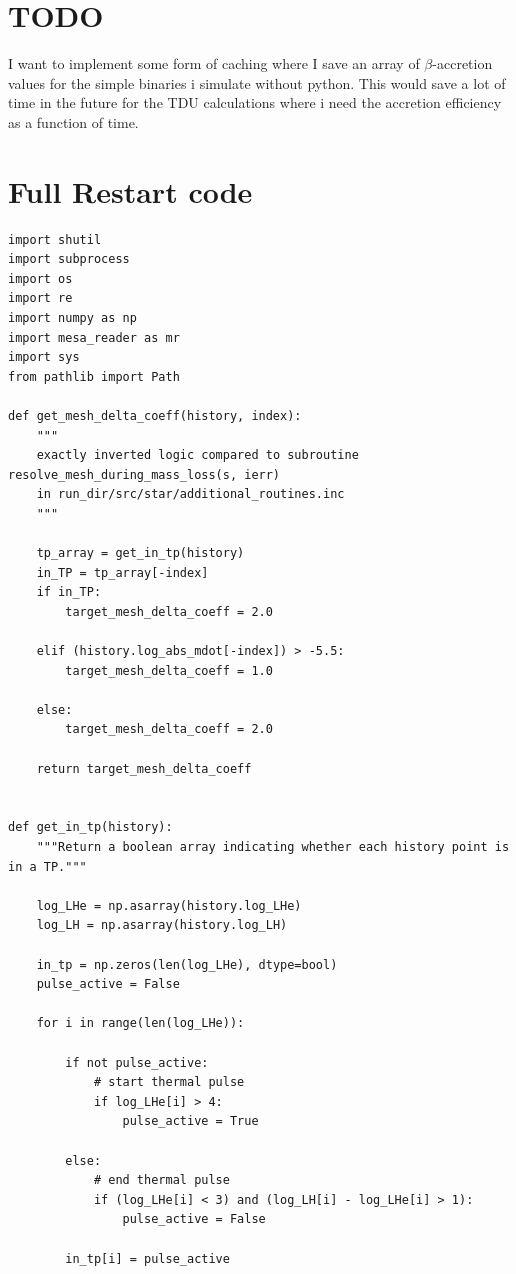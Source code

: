 \documentclass[a4paper,10pt]{article}
\begin{document}
\section{TODO}
I want to implement some form of caching where I save an array of \(\beta \)-accretion values for the simple binaries i simulate without python. This would save a lot of time in the future for the TDU calculations where i need the accretion efficiency as a function of time.


\nextpage
\appendix
\section{Full Restart code}
\begin{full}
\begin{verbatim}
import shutil
import subprocess
import os
import re
import numpy as np
import mesa_reader as mr
import sys
from pathlib import Path

def get_mesh_delta_coeff(history, index):
    """
    exactly inverted logic compared to subroutine resolve_mesh_during_mass_loss(s, ierr)
    in run_dir/src/star/additional_routines.inc
    """

    tp_array = get_in_tp(history)
    in_TP = tp_array[-index]
    if in_TP:
        target_mesh_delta_coeff = 2.0

    elif (history.log_abs_mdot[-index]) > -5.5:
        target_mesh_delta_coeff = 1.0

    else:
        target_mesh_delta_coeff = 2.0

    return target_mesh_delta_coeff


def get_in_tp(history):
    """Return a boolean array indicating whether each history point is in a TP."""

    log_LHe = np.asarray(history.log_LHe)
    log_LH = np.asarray(history.log_LH)

    in_tp = np.zeros(len(log_LHe), dtype=bool)
    pulse_active = False

    for i in range(len(log_LHe)):

        if not pulse_active:
            # start thermal pulse
            if log_LHe[i] > 4:
                pulse_active = True

        else:
            # end thermal pulse
            if (log_LHe[i] < 3) and (log_LH[i] - log_LHe[i] > 1):
                pulse_active = False

        in_tp[i] = pulse_active


\end{verbatim}
\end{full}
\end{document}

